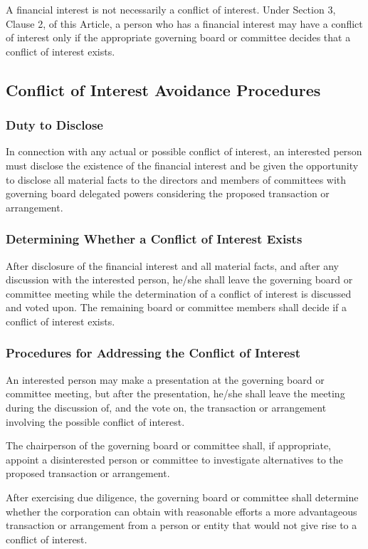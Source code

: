\documentclass{article}
\begin{document}
		A financial interest is not necessarily a conflict of interest. Under Section 3, Clause 2, of this Article, a person who has a financial interest may have a conflict of interest only if the appropriate governing board or committee decides that a conflict of interest exists.
	
	
	\subsection{Conflict of Interest Avoidance Procedures}
		\subsubsection{Duty to Disclose}
			In connection with any actual or possible conflict of interest, an interested person must disclose the existence of the financial interest and be given the opportunity to disclose all material facts to the directors and members of committees with governing board delegated powers considering the proposed transaction or arrangement.
		\subsubsection{Determining Whether a Conflict of Interest Exists}
		After disclosure of the financial interest and all material facts, and after any discussion with the interested person, he/she shall leave the governing board or committee meeting while the determination of a conflict of interest is discussed and voted upon. The remaining board or committee members shall decide if a conflict of interest exists.
		\subsubsection{Procedures for Addressing the Conflict of Interest}
		An interested person may make a presentation at the governing board or committee meeting, but after the presentation, he/she shall leave the meeting during the discussion of, and the vote on, the transaction or arrangement involving the possible conflict of interest.
		
		The chairperson of the governing board or committee shall, if appropriate, appoint a disinterested person or committee to investigate alternatives to the proposed transaction or arrangement.
		
		After exercising due diligence, the governing board or committee shall determine whether the corporation can obtain with reasonable efforts a more advantageous transaction or arrangement from a person or entity that would not give rise to a conflict of interest.
		
\end{document}
